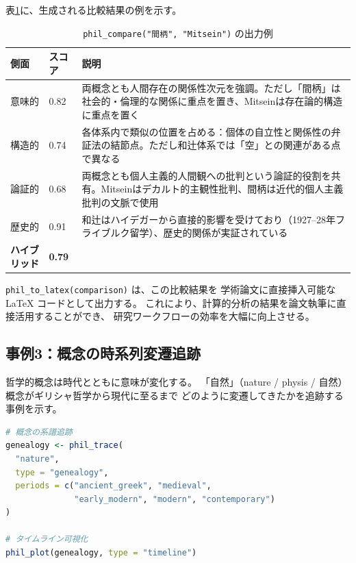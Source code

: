 \documentclass[a4paper,11pt]{ltjsarticle}
\begin{document}
表\ref{tab:comparison-result}に、生成される比較結果の例を示す。

\begin{table}[H]
\centering
\caption{\texttt{phil\_compare("間柄", "Mitsein")} の出力例}
\label{tab:comparison-result}
\small
\begin{tabular}{llp{7cm}}
\toprule
\textbf{側面} & \textbf{スコア} & \textbf{説明} \\
\midrule
意味的 & 0.82 & 両概念とも人間存在の関係性次元を強調。ただし「間柄」は社会的・倫理的な関係に重点を置き、Mitseinは存在論的構造に重点を置く \\
構造的 & 0.74 & 各体系内で類似の位置を占める：個体の自立性と関係性の弁証法の結節点。ただし和辻体系では「空」との関連がある点で異なる \\
論証的 & 0.68 & 両概念とも個人主義的人間観への批判という論証的役割を共有。Mitseinはデカルト的主観性批判、間柄は近代的個人主義批判の文脈で使用 \\
歴史的 & 0.91 & 和辻はハイデガーから直接的影響を受けており（1927--28年フライブルク留学）、歴史的関係が実証されている \\
\midrule
\textbf{ハイブリッド} & \textbf{0.79} & \\
\bottomrule
\end{tabular}
\end{table}

\texttt{phil\_to\_latex(comparison)} は、この比較結果を
学術論文に直接挿入可能な LaTeX コードとして出力する。
これにより、計算的分析の結果を論文執筆に直接活用することができ、
研究ワークフローの効率を大幅に向上させる。

\subsection{事例3：概念の時系列変遷追跡}\label{sec:case3}

哲学的概念は時代とともに意味が変化する。
「自然」（nature / physis / 自然）概念がギリシャ哲学から現代に至るまで
どのように変遷してきたかを追跡する事例を示す。

\begin{lstlisting}[language=R,caption=「自然」概念の時系列変遷追跡]
# 概念の系譜追跡
genealogy <- phil_trace(
  "nature",
  type = "genealogy",
  periods = c("ancient_greek", "medieval",
              "early_modern", "modern", "contemporary")
)

# タイムライン可視化
phil_plot(genealogy, type = "timeline")
\end{lstlisting}
\end{document}
